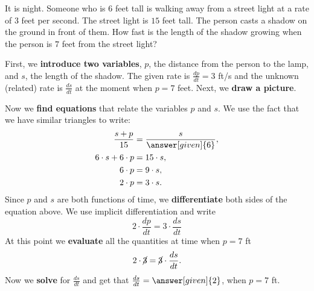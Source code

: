 \documentclass{ximera}
\begin{document}
	\begin{example}
		It is night. Someone who is $6$ feet tall is walking away from a
		street light at a rate of $3$ feet per second.  The street light is
		$15$ feet tall.  The person casts a shadow on the ground in front of
		them. How fast is the length of the shadow growing when the person
		is $7$ feet from the street light?
		
		\begin{explanation}
			First, we \textbf{introduce two variables}, $p$, the distance from the person to the lamp, and  $s$, the length of the shadow.
			The given rate is $\frac{dp}{dt}=3$ ft/s and the unknown (related) rate is $\frac{ds}{dt}$ at the moment when $p=7$ feet.
			Next, we \textbf{draw a picture}.
			\begin{image}
			\end{image}
			
			Now we \textbf{find equations} that relate the variables $p$ and $s$. We use the fact that we
			have similar triangles to write:
			\begin{align*}
				\frac{s+p}{15} &= \frac{s}{\answer[given]{6}},\\
				6\cdot s + 6 \cdot p &= 15\cdot s,\\
				6\cdot p &=9\cdot s,\\
				2\cdot p &=3 \cdot s. 
			\end{align*}
			Since $p$ and $s$ are both functions of time, we 
			\textbf{differentiate} both sides of the equation above. We  use
			implicit differentiation and write
			\[
			2\cdot \frac{dp}{dt} =3 \cdot \frac{ds}{dt}
			\]
			At this point we \textbf{evaluate} all the quantities at time when $p=7$ ft 
			\[
			2\cdot \cancel{3} = \cancel{3} \cdot \frac{ds}{dt}.
			\]
			Now we \textbf{solve} for  $\frac{ds}{dt}$ and get that
			$\frac{ds}{dt}= \answer[given]{2}$, when $p=7$ ft.
			

\end{explanation}
\end{example}
\end{document}
